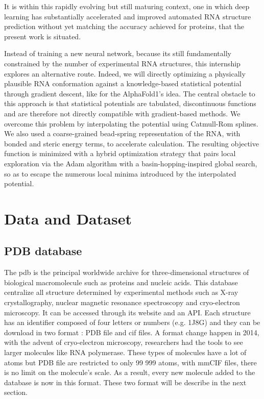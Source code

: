 \documentclass[11pt,a4paper]{article}
\begin{document}
It is within this rapidly evolving but still maturing context, one in which deep learning has substantially accelerated and improved automated RNA structure prediction without yet matching the accuracy achieved for proteins, that the present work is situated.

Instead of training a new neural network, because its still fundamentally constrained by the number of experimental RNA structures, this internship explores an alternative route. Indeed, we will directly optimizing a physically plausible RNA conformation against a knowledge-based statistical potential through gradient descent, like for the AlphaFold1's idea. The central obstacle to this approach is that statistical potentials are tabulated, discontinuous functions and are therefore not directly compatible with gradient-based methods. We overcome this problem by interpolating the potential using Catmull-Rom splines. We also used a coarse-grained bead-spring representation of the RNA, with bonded and steric energy terms, to accelerate calculation. The resulting objective function is minimized with a hybrid optimization strategy that pairs local exploration via the Adam algorithm with a basin-hopping-inspired global search, so as to escape the numerous local minima introduced by the interpolated potential.

\newpage
\section{Data and Dataset}
\subsection{PDB database}

The \acrfull{pdb} \cite{berman2000pdb,rcsb2025pdb} is the principal worldwide archive for three-dimensional structures of biological macromolecule such as proteins and nucleic acids. This database centralize all structure determined by experimental methods such as X-ray crystallography, nuclear magnetic resonance spectroscopy and cryo-electron microscopy. It can be accessed through its website and an API. Each structure has an identifier composed of four letters or numbers (e.g. 1J8G) and they can be download in two format : PDB file and \acrfull{cif} files. A format change happen in 2014, with the advent of cryo-electron microscopy, researchers had the tools to see larger molecules like RNA polymerase. These types of molecules have a lot of atoms but PDB file are restricted to only 99 999 atoms, with mmCIF files, there is no limit on the molecule's scale. As a result, every new molecule added to the database is now in this format. These two format will be describe in the next section. 
\end{document}
